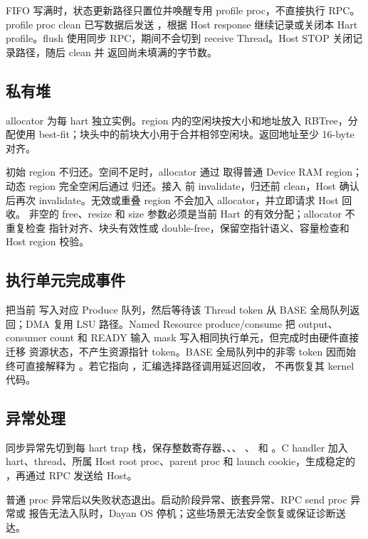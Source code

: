 \documentclass[../dayan_kernel_manual.tex]{subfiles}
\begin{document}
FIFO 写满时，状态更新路径只置位并唤醒专用 profile proc，不直接执行 RPC。profile proc
clean 已写数据后发送 ，根据 Host response 继续记录或关闭本
Hart profile。flush 使用同步 RPC，期间不会切到 receive Thread。Host STOP 关闭记录路径，随后 clean 并
返回尚未填满的字节数。

\subsection{私有堆}

allocator 为每 hart 独立实例。region 内的空闲块按大小和地址放入 RBTree，分配使用
best-fit；块头中的前块大小用于合并相邻空闲块。返回地址至少 16-byte 对齐。

初始 region 不归还。空间不足时，allocator 通过  取得普通
Device RAM region；动态 region 完全空闲后通过  归还。接入
前 invalidate，归还前 clean，Host 确认后再次 invalidate。无效或重叠 region 不会加入
allocator，并立即请求 Host 回收。
非空的 free、resize 和 size 参数必须是当前 Hart 的有效分配；allocator 不重复检查
指针对齐、块头有效性或 double-free，保留空指针语义、容量检查和 Host region 校验。

\subsection{执行单元完成事件}

 把当前  写入对应 Produce 队列，然后等待该
Thread token 从 BASE 全局队列返回；DMA 复用 LSU 路径。Named Resource produce/consume
把 output、consumer count 和 READY 输入 mask 写入相同执行单元，但完成时由硬件直接迁移
资源状态，不产生资源指针 token。BASE 全局队列中的非零 token 因而始终可直接解释为
。若它指向 ，汇编选择路径调用延迟回收，
不再恢复其 kernel 代码。

\subsection{异常处理}

同步异常先切到每 hart trap 栈，保存整数寄存器、、、
、 和 。C handler 加入 hart、thread、所属 Host
root proc、parent proc 和 launch cookie，生成稳定的 ，再通过 RPC
发送给 Host。

普通 proc 异常后以失败状态退出。启动阶段异常、嵌套异常、RPC send proc 异常或
报告无法入队时，Dayan OS 停机；这些场景无法安全恢复或保证诊断送达。
\end{document}
